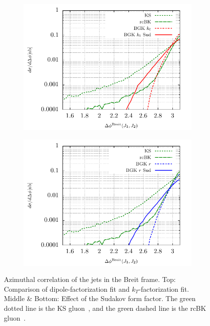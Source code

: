\documentclass[11pt]{article}
\begin{document}
\begin{figure}[p]
	\begin{subfigure}{0.5\textwidth}
		\includegraphics[width=\textwidth]{plots/plotBGK2Jets}
	\end{subfigure}
	\begin{subfigure}{0.5\textwidth}
		\includegraphics[width=\textwidth]{plots/plotBGK3Jets}
	\end{subfigure}
\caption{Azimuthal correlation of the jets in the Breit frame. Top: Comparison of dipole-factorization fit and $k_T$-factorization fit. Middle \& Bottom: Effect of the Sudakov form factor. The green dotted line is the KS gluon~\cite{vanHameren:2021sqc}, and the green dashed line is the rcBK gluon~\cite{Albacete:2010sy}. }
\label{fig:jj-breit}
\end{figure}
\end{document}
